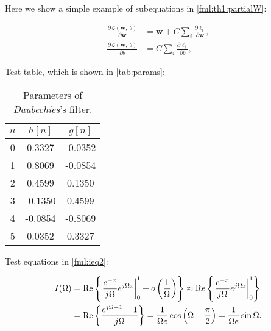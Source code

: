 \documentclass[color,hyper]{NRSMRev}
\begin{document}
\begin{theorem} \label{th1}
  Here we show a simple example of subequations in \eqref{fml:th1:partialW}:
  
  \begin{subequations}
    \renewcommand{\theequation}
    {\theparentequation-\arabic{equation}}
    \begin{align}
      \frac{\partial \mathcal{L}(\mathbf{w},~b)}{\partial \mathbf{w}} &= \mathbf{w} + C \sum\limits_i\frac{\partial \ell_i}{\partial \mathbf{w}}, \label{fml:th1:partialW}\\
      \frac{\partial \mathcal{L}(\mathbf{w},~b)}{\partial b} &= C \sum\limits_i\frac{\partial \ell_i}{\partial b}, \label{fml:th1:partialb}
    \end{align}
  \end{subequations}
\end{theorem}

Test table, which is shown in \autoref{tab:params}:

\begin{table}[htbp]
  \centering
  \caption[Parameters of Daubechies's filter.]{Parameters of \textit{Daubechies}'s filter.}
  \label{tab:params}
  \begin{tabular}{|c|c|c|}
    \hline
    $n$ & $h[n]$ & $g[n]$ \\ \hline
    0 &  0.3327 & -0.0352 \\ \hline
    1 &  0.8069 & -0.0854 \\ \hline
    2 &  0.4599 &  0.1350 \\ \hline
    3 & -0.1350 &  0.4599 \\ \hline
    4 & -0.0854 & -0.8069 \\ \hline
    5 &  0.0352 &  0.3327 \\ \hline
  \end{tabular}
\end{table}

Test equations in \eqref{fml:ieq2}:

\begin{equation} \label{fml:ieq2}
  \begin{aligned}
    I (\Omega) &= \tRe{ \left. \frac{e^{-x}}{j \Omega} e^{j \Omega x} \right|_0^1 + o\left( \frac{1}{\Omega} \right) } \approx \tRe{ \left. \frac{e^{-x}}{j \Omega} e^{j \Omega x} \right|_0^1 } \\
    &= \tRe{ \frac{e^{j\Omega-1} - 1}{j \Omega} } = \frac{1}{\Omega e} \cos \left( \Omega - \frac{\pi}{2} \right) = \frac{1}{\Omega e} \sin \Omega. 
  \end{aligned}
\end{equation}
\end{document}
